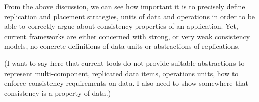 From the above discussion, we can see how important it is to precisely define
replication and placement strategies, units of data and operations in order to
be able to correctly argue about consistency properties of an application. Yet,
current frameworks are either concerned with strong,
or very weak consistency models, no concrete definitions of data units or
abstractions of replications. 


(I want to say here that current tools do not provide suitable abstractions to
represent multi-component, replicated data items, operations units, how to
enforce consistency requirements on data. I also need to show somewhere that
consistency is a property of data.)\\

